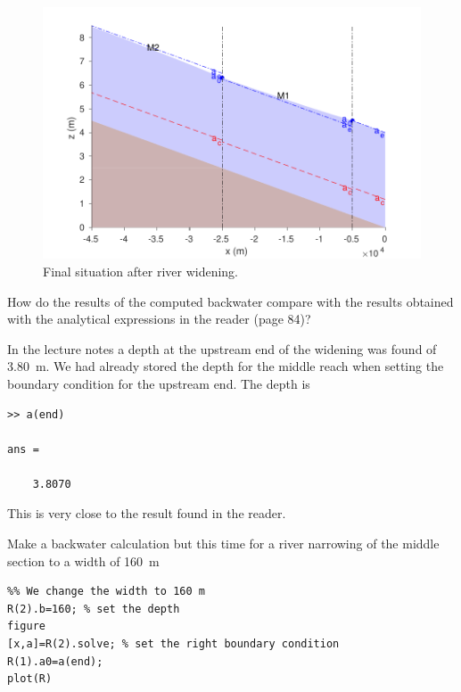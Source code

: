\documentclass[a4paper]{article}
\begin{document}
\begin{figure}[h]
  \centering
  \includegraphics{widening_final.pdf}
  \caption{Final situation after river widening.}
  \label{fig:widening_final}
\end{figure}

\begin{exercise}
  How do the results of the computed backwater compare with the results obtained with the analytical expressions in the reader (page 84)?
\end{exercise}

\begin{solution}
    In the lecture notes a depth at the upstream end of the widening was found of \SI{3.80}{\m}.
    We had already stored the depth for the middle reach when setting the boundary condition for the upstream end. The depth is 
    \begin{lstlisting}
>> a(end)

ans =

    3.8070
    \end{lstlisting}
    This is very close to the result found in the reader.
\end{solution}

\begin{exercise}
  Make a backwater calculation but this time for a river narrowing of the middle section to a width of \SI{160}{\m}
\end{exercise}

\begin{solution}
    \begin{lstlisting}
%% We change the width to 160 m
R(2).b=160; % set the depth
figure
[x,a]=R(2).solve; % set the right boundary condition
R(1).a0=a(end);
plot(R)
    \end{lstlisting}
\end{solution}
\end{document}
